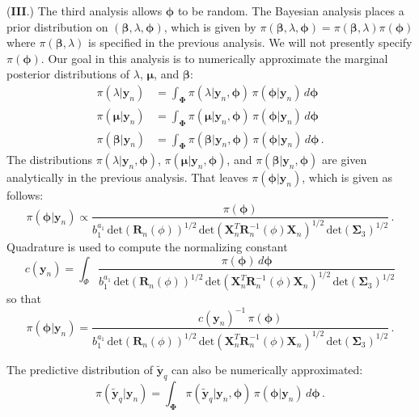 \documentclass[11pt, oneside]{article}   	%
\begin{document}
({\bf III}.)  The third analysis allows $\mathbf{\phi}$ to be random.  The Bayesian analysis places a prior distribution on $(\mathbf{\beta}, \lambda, \mathbf{\phi})$, which is given by $\pi(\mathbf{\beta}, \lambda, \mathbf{\phi}) = \pi(\mathbf{\beta}, \lambda) \pi(\mathbf{\phi})$ where $\pi(\mathbf{\beta}, \lambda)$ is specified in the previous analysis.  We will not presently specify $\pi(\mathbf{\phi})$.  Our goal in this analysis is to numerically approximate the marginal posterior distributions of $\lambda$, $\mathbf{\mu}$, and $\mathbf{\beta}$:
\begin{align*}
\pi(\lambda | \mathbf{y}_n ) & = \int_\mathbf{\Phi} \pi(\lambda | \mathbf{y}_n, \mathbf{\phi}) \, \pi(\mathbf{\phi} | \mathbf{y}_n) \, d\mathbf{\phi} \\[1ex]
\pi(\mathbf{\mu} | \mathbf{y}_n ) & = \int_\mathbf{\Phi} \pi(\mathbf{\mu} | \mathbf{y}_n, \mathbf{\phi}) \, \pi(\mathbf{\phi} | \mathbf{y}_n) \, d\mathbf{\phi} \\[1ex]
\pi(\mathbf{\beta} | \mathbf{y}_n ) & = \int_\mathbf{\Phi} \pi(\mathbf{\beta} | \mathbf{y}_n, \mathbf{\phi}) \, \pi(\mathbf{\phi} | \mathbf{y}_n) \, d\mathbf{\phi} \,.
\end{align*}
The distributions $\pi(\lambda | \mathbf{y}_n, \mathbf{\phi})$, $\pi(\mathbf{\mu} | \mathbf{y}_n, \mathbf{\phi})$, and $\pi(\mathbf{\beta} | \mathbf{y}_n, \mathbf{\phi})$ are given analytically in the previous analysis.  That leaves $\pi(\mathbf{\phi} | \mathbf{y}_n)$, which is given as follows:
\[
\pi(\mathbf{\phi} | \mathbf{y}_n) \propto \frac{\pi(\mathbf{\phi})}{b_1^{a_1} \,\mbox{det}(\mathbf{R}_n(\phi))^{1/2} \, \mbox{det}(\mathbf{X}_n^T \mathbf{R}_n^{-1}(\phi) \mathbf{X}_n)^{1/2} \, \mbox{det}(\mathbf{\Sigma}_3)^{1/2}} \,.
\]
Quadrature is used to compute the normalizing constant
\[
c(\mathbf{y}_n) = \int_{\Phi} \frac{\pi(\mathbf{\phi}) \, d \mathbf{\phi}}{b_1^{a_1} \,\mbox{det}(\mathbf{R}_n(\phi))^{1/2} \, \mbox{det}(\mathbf{X}_n^T \mathbf{R}_n^{-1}(\phi) \mathbf{X}_n)^{1/2} \, \mbox{det}(\mathbf{\Sigma}_3)^{1/2}}
\]
so that
\[
\pi(\mathbf{\phi} | \mathbf{y}_n) = \frac{c(\mathbf{y}_n)^{-1} \, \pi(\mathbf{\phi})}{b_1^{a_1} \,\mbox{det}(\mathbf{R}_n(\phi))^{1/2} \, \mbox{det}(\mathbf{X}_n^T \mathbf{R}_n^{-1}(\phi) \mathbf{X}_n)^{1/2} \, \mbox{det}(\mathbf{\Sigma}_3)^{1/2}} \,.
\]

The predictive distribution of $\tilde{\mathbf{y}}_q$ can also be numerically approximated:
\[
\pi(\tilde{\mathbf{y}}_q | \mathbf{y}_n) = \int_\mathbf{\Phi} \pi(\tilde{\mathbf{y}}_q | \mathbf{y}_n, \mathbf{\phi}) \, \pi(\mathbf{\phi} | \mathbf{y}_n) \, d\mathbf{\phi} \,.
\]
\end{document}
